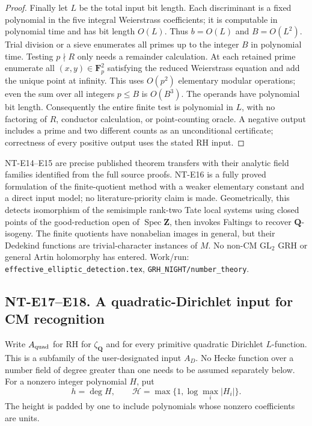 \begin{proof}
Finally let $L$ be the total input bit length.
Each discriminant is a fixed polynomial in
the five integral Weierstrass coefficients;
it is computable in polynomial time and
has bit length $O(L)$. Thus $b=O(L)$ and
$B=O(L^2)$. Trial division or a sieve
enumerates all primes up to the integer $B$
in polynomial time. Testing $p\nmid R$ only
needs a remainder calculation.
At each retained prime enumerate all
$(x,y)\in\mathbf F_p^2$ satisfying the reduced
Weierstrass equation and add the unique point
at infinity. This uses $O(p^2)$ elementary
modular operations; even the sum over all
integers $p\le B$ is $O(B^3)$.
The operands have polynomial bit length.
Consequently the entire finite test is
polynomial in $L$, with no factoring of $R$,
conductor calculation, or point-counting
oracle. A negative output includes a prime
and two different counts as an unconditional
certificate; correctness of every positive
output uses the stated RH input.
\end{proof}

NT-E14--E15 are precise published theorem
transfers with their analytic field families
identified from the full source proofs.
NT-E16 is a fully proved formulation of the
finite-quotient method with a weaker elementary
constant and a direct input model; no
literature-priority claim is made.
Geometrically, this detects isomorphism of
the semisimple rank-two Tate local systems
using closed points of the good-reduction
open of $\operatorname{Spec}\mathbf Z$,
then invokes Faltings to recover
$\mathbf Q$-isogeny. The finite quotients
have nonabelian images in general, but their
Dedekind functions are trivial-character
instances of $M$. No non-CM $\mathrm{GL}_2$
GRH or general Artin holomorphy has entered.
Work/run: \texttt{effective\_elliptic\_detection.tex},
\texttt{GRH\_NIGHT/number\_theory}.

\subsection*{NT-E17--E18. A quadratic-Dirichlet input for CM recognition}

Write $A_{\rm quad}$ for RH for $\zeta_{\mathbf Q}$ and
for every primitive quadratic Dirichlet $L$-function.
This is a subfamily of the user-designated input $A_D$.
No Hecke function over a number field of degree greater
than one needs to be assumed separately below.
For a nonzero integer polynomial $H$, put
\[
 h=\deg H,\qquad
 \mathcal H=\max\{1,\log\max_i|H_i|\}.
\]
The height is padded by one to include polynomials
whose nonzero coefficients are units.

